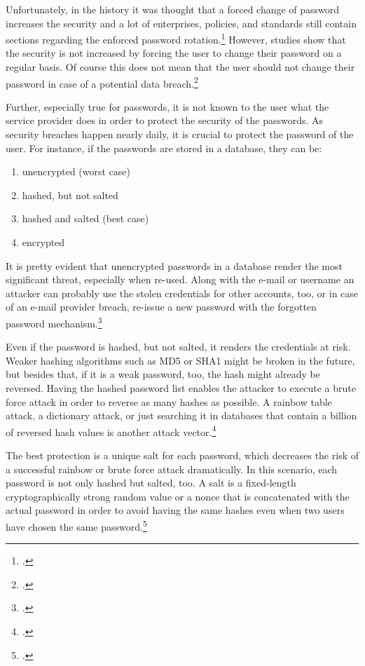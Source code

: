 Unfortunately, in the history it was thought that a forced change of password increases the security and a lot of enterprises, policies, and standards still contain sections regarding the enforced password rotation.\footcites[See][1520]{deutschlandgrundschutz} However, studies show that the security is not increased by forcing the user to change their password on a regular basis. Of course this does not mean that the user should not change their password in case of a potential data breach.\footcites[See][14]{SP80063B}[See][]{7676198}[See][34]{anderson2008security}

Further, especially true for passwords, it is not known to the user what the service provider does in order to protect the security of the passwords. As security breaches happen nearly daily, it is crucial to protect the password of the user. For instance, if the passwords are stored in a database, they can be:

\begin{enumerate}[label=(\alph*)]
	\item unencrypted (worst case)
	\item hashed, but not salted
	\item hashed and salted (best case)
	\item encrypted
\end{enumerate}

It is pretty evident that unencrypted passwords in a database render the most significant threat, especially when re-used. Along with the e-mail or username an attacker can probably use the stolen credentials for other accounts, too, or in case of an e-mail provider breach, re-issue a new password with the \frqq forgotten password\flqq{} mechanism.\footcite[See][277]{shostack2014threat}

Even if the password is hashed, but not salted, it renders the credentials at risk. Weaker hashing algorithms such as MD5 or SHA1 might be broken in the future, but besides that, if it is a weak password, too, the hash might already be reversed. Having the hashed password list enables the attacker to execute a brute force attack in order to reverse as many hashes as possible. A rainbow table attack, a dictionary attack, or just searching it in databases that contain a billion of reversed hash values is another attack vector.\footcites[See][1425]{Thomas:2017:DBP:3133956.3134067}[See][427--430]{320284}[See][56--57]{anderson2008security}

The best protection is a unique salt for each password, which decreases the risk of a successful rainbow or brute force attack dramatically. In this scenario, each password is not only hashed but salted, too. A salt is a fixed-length cryptographically strong random value or a \gls{nonce} that is concatenated with the actual password in order to avoid having the same hashes even when two users have chosen the same password.\footcites[See][32--34]{IdentityandDataSecurityforWebDevelopment}[See][130--131]{brotherston2017defensive}

